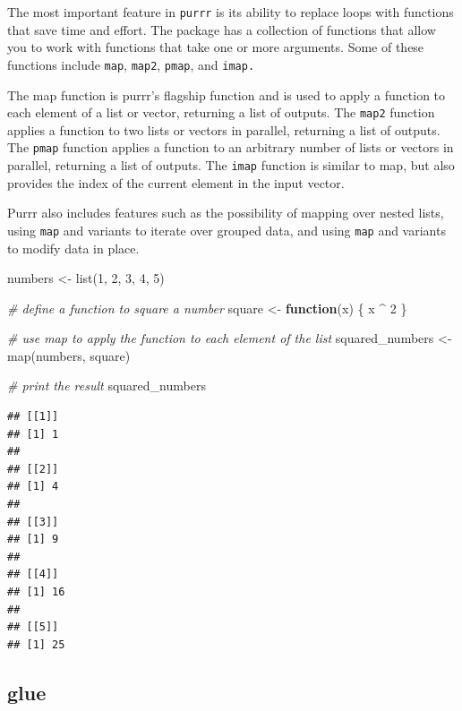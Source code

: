 \documentclass[
]{book}
\newenvironment{Shaded}{\begin{snugshade}}{\end{snugshade}}
\newcommand{\CommentTok}[1]{\textcolor[rgb]{0.56,0.35,0.01}{\textit{#1}}}
\newcommand{\ControlFlowTok}[1]{\textcolor[rgb]{0.13,0.29,0.53}{\textbf{#1}}}
\newcommand{\DecValTok}[1]{\textcolor[rgb]{0.00,0.00,0.81}{#1}}
\newcommand{\FunctionTok}[1]{\textcolor[rgb]{0.00,0.00,0.00}{#1}}
\newcommand{\NormalTok}[1]{#1}
\newcommand{\OtherTok}[1]{\textcolor[rgb]{0.56,0.35,0.01}{#1}}
\newcommand{\SpecialCharTok}[1]{\textcolor[rgb]{0.00,0.00,0.00}{#1}}
\begin{document}
The most important feature in \texttt{purrr} is its ability to replace loops with functions that save time and effort. The package has a collection of functions that allow you to work with functions that take one or more arguments. Some of these functions include \texttt{map}, \texttt{map2}, \texttt{pmap}, and \texttt{imap.}

The map function is purrr's flagship function and is used to apply a function to each element of a list or vector, returning a list of outputs. The \texttt{map2} function applies a function to two lists or vectors in parallel, returning a list of outputs. The \texttt{pmap} function applies a function to an arbitrary number of lists or vectors in parallel, returning a list of outputs. The \texttt{imap} function is similar to map, but also provides the index of the current element in the input vector.

Purrr also includes features such as the possibility of mapping over nested lists, using \texttt{map} and variants to iterate over grouped data, and using \texttt{map} and variants to modify data in place.

\begin{Shaded}
\begin{Highlighting}[]
\NormalTok{numbers }\OtherTok{\textless{}{-}} \FunctionTok{list}\NormalTok{(}\DecValTok{1}\NormalTok{, }\DecValTok{2}\NormalTok{, }\DecValTok{3}\NormalTok{, }\DecValTok{4}\NormalTok{, }\DecValTok{5}\NormalTok{)}

\CommentTok{\# define a function to square a number}
\NormalTok{square }\OtherTok{\textless{}{-}} \ControlFlowTok{function}\NormalTok{(x) \{ x }\SpecialCharTok{\^{}} \DecValTok{2}\NormalTok{ \}}

\CommentTok{\# use map to apply the function to each element of the list}
\NormalTok{squared\_numbers }\OtherTok{\textless{}{-}} \FunctionTok{map}\NormalTok{(numbers, square)}

\CommentTok{\# print the result}
\NormalTok{squared\_numbers}
\end{Highlighting}
\end{Shaded}

\begin{verbatim}
## [[1]]
## [1] 1
## 
## [[2]]
## [1] 4
## 
## [[3]]
## [1] 9
## 
## [[4]]
## [1] 16
## 
## [[5]]
## [1] 25
\end{verbatim}

\hypertarget{glue}{%
\subsection{glue}\label{glue}}
\end{document}
